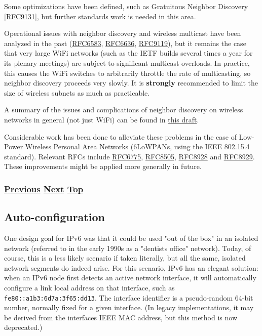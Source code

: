 \documentclass[
]{article}
\begin{document}
Some optimizations have been defined, such as Gratuitous Neighbor
Discovery {[}\href{https://www.rfc-editor.org/info/rfc9131}{RFC9131}{]},
but further standards work is needed in this area.

Operational issues with neighbor discovery and wireless multicast have
been analyzed in the past
(\href{https://www.rfc-editor.org/info/rfc6583}{RFC6583},
\href{https://www.rfc-editor.org/info/rfc6636}{RFC6636},
\href{https://www.rfc-editor.org/info/rfc9119}{RFC9119}), but it remains
the case that very large WiFi networks (such as the IETF builds several
times a year for its plenary meetings) are subject to significant
multicast overloads. In practice, this causes the WiFi switches to
arbitrarily throttle the rate of multicasting, so neighbor discovery
proceeds very slowly. It is \textbf{strongly} recommended to limit the
size of wireless subnets as much as practicable.

A summary of the issues and complications of neighbor discovery on
wireless networks in general (not just WiFi) can be found in
\href{https://datatracker.ietf.org/doc/draft-ietf-6man-ipv6-over-wireless/}{this
draft}.

Considerable work has been done to alleviate these problems in the case
of Low-Power Wireless Personal Area Networks (6LoWPANs, using the IEEE
802.15.4 standard). Relevant RFCs include
\href{https://www.rfc-editor.org/info/rfc6775}{RFC6775},
\href{https://www.rfc-editor.org/info/rfc8505}{RFC8505},
\href{https://www.rfc-editor.org/info/rfc8928}{RFC8928} and
\href{https://www.rfc-editor.org/info/rfc8929}{RFC8929}. These
improvements might be applied more generally in future.

\subsubsection{\texorpdfstring{\hyperref[layer-2-functions]{Previous}
\hyperref[auto-configuration]{Next}
\hyperref[ipv6-basic-technology]{Top}}{Previous Next Top}}\label{previous-next-top-9}

\pagebreak

\subsection{Auto-configuration}\label{auto-configuration}

One design goal for IPv6 was that it could be used "out of the box" in
an isolated network (referred to in the early 1990s as a
"dentist\textquotesingle s office" network). Today, of course, this is a
less likely scenario if taken literally, but all the same, isolated
network segments do indeed arise. For this scenario, IPv6 has an elegant
solution: when an IPv6 node first detects an active network interface,
it will automatically configure a link local address on that interface,
such as \texttt{fe80::a1b3:6d7a:3f65:dd13}. The interface identifier is
a pseudo-random 64-bit number, normally fixed for a given interface. (In
legacy implementations, it may be derived from the
interface\textquotesingle s IEEE MAC address, but this method is now
deprecated.)
\end{document}
